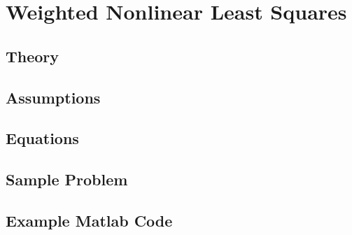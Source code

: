 \section{Weighted Nonlinear Least Squares}
\subsection{Theory}
\subsection{Assumptions}
\subsection{Equations}
\subsection{Sample Problem}
\subsection{Example Matlab Code}
